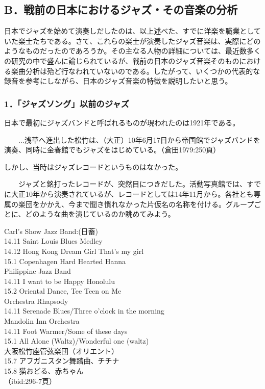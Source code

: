 \subsection{B．戦前の日本におけるジャズ・その音楽の分析}

日本でジャズを始めて演奏しだしたのは、以上述べた、すでに洋楽を職業としていた楽士たちである。さて、これらの楽士が演奏したジャズ音楽は、実際にどのようなものだったのであろうか。その主なる人物の詳細については、最近数多くの研究の中で盛んに論じられているが、戦前の日本のジャズ音楽そのものにおける楽曲分析は殆ど行なわれていないのである。したがって、いくつかの代表的な録音を参考にしながら、日本のジャズ音楽の特徴を説明したいと思う。

\subsubsection{1．「ジャズソング」以前のジャズ}

日本で最初にジャズバンドと呼ばれるものが現われたのは1921年である。

\begin{gquote}
　　...浅草へ進出した松竹は、（大正）10年6月17日から帝国館でジャズバンドを演奏、同時に金春館でもジャズをはじめている。（倉田1979:250頁）
\end{gquote}

しかし、当時はジャズレコードというものはなかった。

\begin{gquote}
　　ジャズと銘打ったレコードが、突然目につきだした。活動写真館では、すでに大正10年から演奏されているが、レコードとしては14年11月から。各社とも専属の楽団をかかえ、今まで聞き慣れなかった片仮名の名称を付ける。グループごとに、どのような曲を演じているのか眺めてみよう。
\end{gquote}

\begin{listblock}
Carl's Show Jazz Band:(日蓄)\\
14.11 Saint Louis Blues Medley\\
14.12 Hong Kong Dream Girl That's my girl\\
15.1 Copenhagen Hard Hearted Hanna\\
Philippine Jazz Band\\
14.11 I want to be Happy Honolulu\\
15.2 Oriental Dance, Tee Teen on Me\\
Orchestra Rhapsody\\
14.11 Serenade Blues/Three o'clock in the morning\\
Mandolin Inn Orchestra\\
14.11 Foot Warmer/Some of these days\\
15.1 All Alone (Waltz)/Wonderful one (waltz)\\
大阪松竹座管弦楽団（オリエント）\\
15.7 アフガニスタン舞踏曲、チチナ\\
15.8 猫おどる、赤ちゃん\\
（ibid:296-7頁）
\end{listblock}


